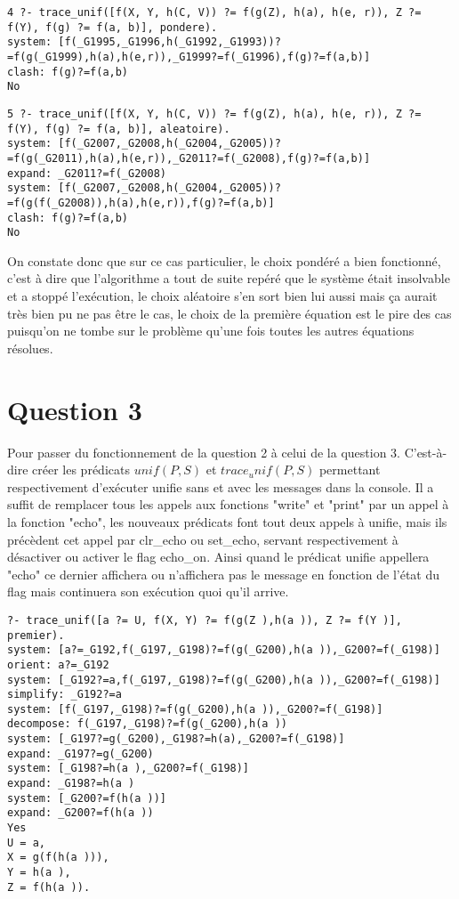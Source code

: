 \documentclass[10pt,a4paper]{report}
\begin{document}
\begin{lstlisting}[caption ={Exemple d'exécution avec le choix pondéré}]
4 ?- trace_unif([f(X, Y, h(C, V)) ?= f(g(Z), h(a), h(e, r)), Z ?= f(Y), f(g) ?= f(a, b)], pondere).
system: [f(_G1995,_G1996,h(_G1992,_G1993))?=f(g(_G1999),h(a),h(e,r)),_G1999?=f(_G1996),f(g)?=f(a,b)]
clash: f(g)?=f(a,b)
No
\end{lstlisting}

\begin{lstlisting}[caption ={Exemple d'exécution avec le choix aléatoire}]
5 ?- trace_unif([f(X, Y, h(C, V)) ?= f(g(Z), h(a), h(e, r)), Z ?= f(Y), f(g) ?= f(a, b)], aleatoire).
system: [f(_G2007,_G2008,h(_G2004,_G2005))?=f(g(_G2011),h(a),h(e,r)),_G2011?=f(_G2008),f(g)?=f(a,b)]
expand: _G2011?=f(_G2008)
system: [f(_G2007,_G2008,h(_G2004,_G2005))?=f(g(f(_G2008)),h(a),h(e,r)),f(g)?=f(a,b)]
clash: f(g)?=f(a,b)
No

\end{lstlisting}

On constate donc que sur ce cas particulier, le choix pondéré a bien fonctionné, c'est à dire que l'algorithme a tout de suite repéré que le système était insolvable et a stoppé l'exécution, le choix aléatoire s'en sort bien lui aussi mais ça aurait très bien pu ne pas être le cas, le choix de la première équation est le pire des cas puisqu'on ne tombe sur le problème qu'une fois toutes les autres équations résolues.

\chapter*{Question 3}

Pour passer du fonctionnement de la question 2 à celui de la question 3. C'est-à-dire créer les prédicats $unif(P,S)$ et $trace_unif(P,S)$ permettant respectivement d'exécuter unifie sans et avec les messages dans la console. Il a suffit de remplacer tous les appels aux fonctions "write" et "print" par un appel à la fonction "echo", les nouveaux prédicats font tout deux appels à unifie, mais ils précèdent cet appel par clr\_echo ou set\_echo, servant respectivement à désactiver ou activer le flag echo\_on. Ainsi quand le prédicat unifie appellera "echo" ce dernier affichera ou n'affichera pas le message en fonction de l'état du flag mais continuera son exécution quoi qu'il arrive.

\begin{lstlisting}[caption ={Exemple d'execution avec un niveau de debug}]
?- trace_unif([a ?= U, f(X, Y) ?= f(g(Z ),h(a )), Z ?= f(Y )], premier).
system: [a?=_G192,f(_G197,_G198)?=f(g(_G200),h(a )),_G200?=f(_G198)]
orient: a?=_G192
system: [_G192?=a,f(_G197,_G198)?=f(g(_G200),h(a )),_G200?=f(_G198)]
simplify: _G192?=a
system: [f(_G197,_G198)?=f(g(_G200),h(a )),_G200?=f(_G198)]
decompose: f(_G197,_G198)?=f(g(_G200),h(a ))
system: [_G197?=g(_G200),_G198?=h(a),_G200?=f(_G198)]
expand: _G197?=g(_G200)
system: [_G198?=h(a ),_G200?=f(_G198)]
expand: _G198?=h(a )
system: [_G200?=f(h(a ))]
expand: _G200?=f(h(a ))
Yes
U = a,
X = g(f(h(a ))),
Y = h(a ),
Z = f(h(a )).
\end{lstlisting}
\end{document}
